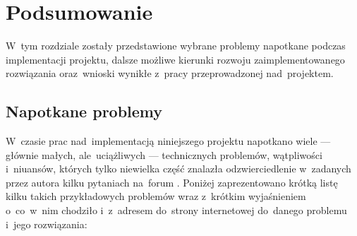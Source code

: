 \documentclass[thesis]{subfiles}
\begin{document}
\chapter{Podsumowanie}

W~tym rozdziale zostały przedstawione wybrane problemy napotkane podczas implementacji projektu, dalsze możliwe kierunki rozwoju zaimplementowanego rozwiązania oraz~wnioski wynikłe z~pracy przeprowadzonej nad~projektem.


\section{Napotkane problemy}

W~czasie prac nad~implementacją niniejszego projektu napotkano wiele --- głównie małych, ale~uciążliwych --- technicznych problemów, wątpliwości i~niuansów, których tylko niewielka część znalazła odzwierciedlenie w~zadanych przez autora kilku pytaniach na~forum . Poniżej zaprezentowano krótką listę kilku takich przykładowych problemów wraz z~krótkim wyjaśnieniem o~co~w~nim chodziło i~z~adresem do~strony internetowej do~danego problemu i~jego rozwiązania:
\end{document}
